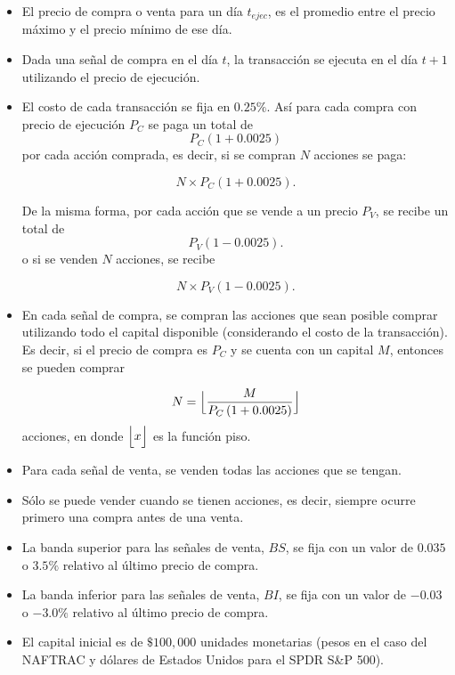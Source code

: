 \documentclass[12pt]{report}
\theoremstyle{break}
\theoremstyle{break}
\begin{document}
\begin{itemize}
\item El precio de compra o venta para un día $t_{ejec}$, es el promedio entre el precio máximo y el precio mínimo de ese día.

\item Dada una señal de compra en el día $t$, la transacción se ejecuta en el día $t+1$ utilizando el precio de ejecución.

\item El costo de cada transacción se fija en $0.25\%$. Así para cada compra con precio de ejecución $P_{C}$ se paga un total de 
$$P_{C}(1 + 0.0025)$$
por cada acción comprada, es decir, si se compran $N$ acciones se paga:

$$N \times P_{C}(1 + 0.0025).$$

De la misma forma, por cada acción que se vende a un precio $P_{V}$, se recibe un total de 
$$P_{V}(1 - 0.0025).$$
o si se venden $N$ acciones, se recibe

$$N \times P_{V}(1 - 0.0025).$$

\item En cada señal de compra, se compran las acciones que sean posible comprar utilizando todo el capital disponible (considerando el costo de la transacción). Es decir, si el precio de compra es $P_{C}$ y se cuenta con un capital $M$, entonces se pueden comprar

$$ N = \Bigl\lfloor \dfrac{M}{ P_{C} \left(1 + 0.0025 \right) } \Bigr\rfloor$$
acciones, en donde $\Bigl\lfloor x \Bigr\rfloor$ es la función piso.
\item Para cada señal de venta, se venden todas las acciones que se tengan.

\item Sólo se puede vender cuando se tienen acciones, es decir, siempre ocurre primero una compra antes de una venta.

\item La banda superior para las señales de venta, $BS$, se fija con un valor de $0.035$ o $3.5\%$ relativo al último precio de compra.

\item La banda inferior para las señales de venta, $BI$, se fija con un valor de $-0.03$ o $-3.0\%$ relativo al último precio de compra.

\item El capital inicial es de $\$100,000$ unidades monetarias (pesos en el caso del NAFTRAC y dólares de Estados Unidos para el SPDR S\&P 500).
\end{itemize}
\end{document}
